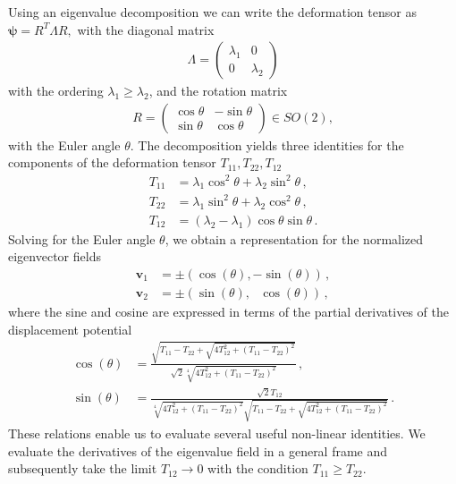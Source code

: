 \documentclass[a4paper, 11pt]{article}
\begin{document}
Using an eigenvalue decomposition we can write the deformation tensor as $\bm{\psi} = R^T \Lambda R,$ with the diagonal matrix
\begin{align}
\Lambda = \begin{pmatrix}\lambda_1 & 0 \\ 0 &\lambda_2 \end{pmatrix}
\end{align}
with the ordering $\lambda_1 \geq \lambda_2$, and the rotation matrix
\begin{align}
R = \begin{pmatrix} \cos \theta & - \sin \theta \\ \sin \theta & \cos \theta \end{pmatrix} \in SO(2),
\end{align}
with the Euler angle $\theta$. The decomposition yields three identities for the components of the deformation tensor $T_{11},T_{22},T_{12}$ 
\begin{align}
T_{11} &= \lambda_1 \cos^2 \theta + \lambda_2 \sin^2 \theta\,,\\
T_{22} &= \lambda_1 \sin^2\theta + \lambda_2 \cos^2 \theta\,,\\
T_{12} &= (\lambda_2 - \lambda_1)\cos \theta \sin \theta\,.
\end{align}
Solving for the Euler angle $\theta$, we obtain a representation for the normalized eigenvector fields
\begin{align}
\bm{v}_1 &=\pm (\cos(\theta), -\sin(\theta))\,,\\
\bm{v}_2 &=\pm (\sin(\theta),\ \ \ \cos(\theta))\,,
\end{align}
where the sine and cosine are expressed in terms of the partial derivatives of the displacement potential
\begin{align}
\cos(\theta) &= \frac{\sqrt{T_{11} - T_{22} + \sqrt{4 T_{12}^2 +(T_{11}-T_{22})^2}}}{\sqrt{2} \sqrt[4]{4T_{12}^2 + (T_{11}-T_{22})^2}}\,,\\
\sin(\theta) &= \frac{\sqrt{2}T_{12}}{\sqrt[4]{4T_{12}^2+(T_{11}-T_{22})^2}\sqrt{T_{11}-T_{22} + \sqrt{4T_{12}^2 + (T_{11}-T_{22})^2}}}\,.
\end{align}
These relations enable us to evaluate several useful non-linear identities. We evaluate the derivatives of the eigenvalue field in a general frame and subsequently take the limit $T_{12} \to 0$ with the condition $T_{11}\geq T_{22}$. 
\end{document}
